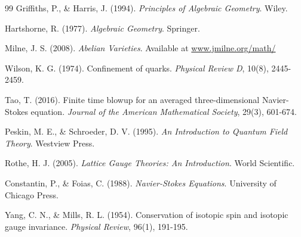 \documentclass[11pt]{amsart}
\begin{document}
\begin{thebibliography}{99}
Griffiths, P., \& Harris, J. (1994). \emph{Principles of Algebraic Geometry}. Wiley.

Hartshorne, R. (1977). \emph{Algebraic Geometry}. Springer.

Milne, J. S. (2008). \emph{Abelian Varieties}. Available at \url{www.jmilne.org/math/}

Wilson, K. G. (1974). Confinement of quarks. \emph{Physical Review D}, 10(8), 2445-2459.

Tao, T. (2016). Finite time blowup for an averaged three-dimensional Navier-Stokes equation. \emph{Journal of the American Mathematical Society}, 29(3), 601-674.

Peskin, M. E., \& Schroeder, D. V. (1995). \emph{An Introduction to Quantum Field Theory}. Westview Press.

Rothe, H. J. (2005). \emph{Lattice Gauge Theories: An Introduction}. World Scientific.

Constantin, P., \& Foias, C. (1988). \emph{Navier-Stokes Equations}. University of Chicago Press.

Yang, C. N., \& Mills, R. L. (1954). Conservation of isotopic spin and isotopic gauge invariance. \emph{Physical Review}, 96(1), 191-195.

\end{thebibliography}
\end{document}
